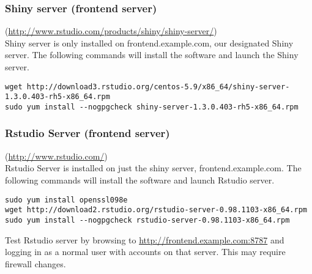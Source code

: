 \subsubsection{Shiny server (frontend server)}(\url{http://www.rstudio.com/products/shiny/shiny-server/})\\

Shiny server is only installed on frontend.example.com, our designated
Shiny server. The following commands will install the software
and launch the Shiny server.

\begin{verbatim}
wget http://download3.rstudio.org/centos-5.9/x86_64/shiny-server-1.3.0.403-rh5-x86_64.rpm
sudo yum install --nogpgcheck shiny-server-1.3.0.403-rh5-x86_64.rpm
\end{verbatim}

\subsubsection{Rstudio Server (frontend server)}(\url{http://www.rstudio.com/})\\
Rstudio Server is installed on just the shiny server,
frontend.example.com.  The following commands will install the software
and launch Rstudio server.
\begin{verbatim}
sudo yum install openssl098e
wget http://download2.rstudio.org/rstudio-server-0.98.1103-x86_64.rpm
sudo yum install --nogpgcheck rstudio-server-0.98.1103-x86_64.rpm
\end{verbatim}

Test Rstudio server by browsing to \url{http://frontend.example.com:8787}
and logging in as a normal user with accounts on that server.  This may
require firewall changes.

